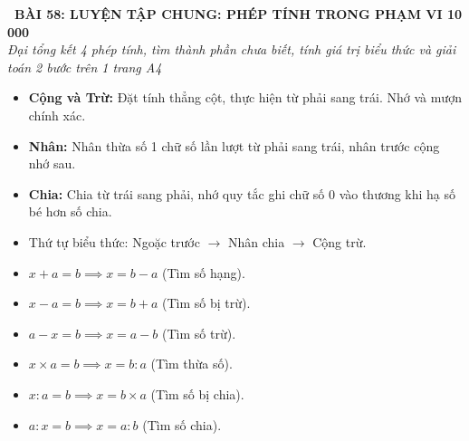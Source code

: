 \documentclass[11pt,a4paper]{article}
\begin{document}
\begin{tcolorbox}[
  enhanced,
  colback=white,
  colframe=primary,
  arc=3mm,
  boxrule=1.2pt,
  left=4mm, right=4mm, top=2.5mm, bottom=2.5mm,
  drop shadow=black!10!white
]
  \centering
  {\Large\bfseries\color{primary}\faBookmark\ BÀI 58: LUYỆN TẬP CHUNG: PHÉP TÍNH TRONG PHẠM VI 10 000}\\[1.5mm]
  {\small\itshape\color{black!75}Đại tổng kết 4 phép tính, tìm thành phần chưa biết, tính giá trị biểu thức và giải toán 2 bước trên 1 trang A4}
\end{tcolorbox}

\vspace{-2mm}


\noindent
\begin{minipage}[t]{0.49\textwidth}\vspace{0pt}
\begin{tcolorbox}[
  enhanced,
  colback=blue!4!white,
  colframe=blue!75!black,
  arc=2mm, boxrule=0.8pt,
  left=2mm, right=2mm, top=1.8mm, bottom=1.8mm,
  title={\footnotesize\bfseries\color{white}\faCalculator\ 1. Đại tổng kết 4 phép tính}
]
{\footnotesize
\begin{itemize}\setlength{\itemsep}{1.5pt}\setlength{\leftskip}{-2.5mm}
  \item \textbf{Cộng và Trừ:} Đặt tính thẳng cột, thực hiện từ phải sang trái. Nhớ và mượn chính xác.
  \item \textbf{Nhân:} Nhân thừa số 1 chữ số lần lượt từ phải sang trái, nhân trước cộng nhớ sau.
  \item \textbf{Chia:} Chia từ trái sang phải, nhớ quy tắc ghi chữ số $0$ vào thương khi hạ số bé hơn số chia.
  \item Thứ tự biểu thức: Ngoặc trước $\to$ Nhân chia $\to$ Cộng trừ.
\end{itemize}
}
\end{tcolorbox}
\end{minipage}
\hfill
\begin{minipage}[t]{0.49\textwidth}\vspace{0pt}
\begin{tcolorbox}[
  enhanced,
  colback=teal!4!white,
  colframe=teal!75!black,
  arc=2mm, boxrule=0.8pt,
  left=2mm, right=2mm, top=1.8mm, bottom=1.8mm,
  title={\footnotesize\bfseries\color{white}\faSliders\ 2. Tìm thành phần chưa biết}
]
{\footnotesize
\begin{itemize}\setlength{\itemsep}{1.5pt}\setlength{\leftskip}{-2.5mm}
  \item $x + a = b \implies x = b - a$ (Tìm số hạng).
  \item $x - a = b \implies x = b + a$ (Tìm số bị trừ).
  \item $a - x = b \implies x = a - b$ (Tìm số trừ).
  \item $x \times a = b \implies x = b : a$ (Tìm thừa số).
  \item $x : a = b \implies x = b \times a$ (Tìm số bị chia).
  \item $a : x = b \implies x = a : b$ (Tìm số chia).
\end{itemize}
}
\end{tcolorbox}
\end{minipage}
\end{document}
